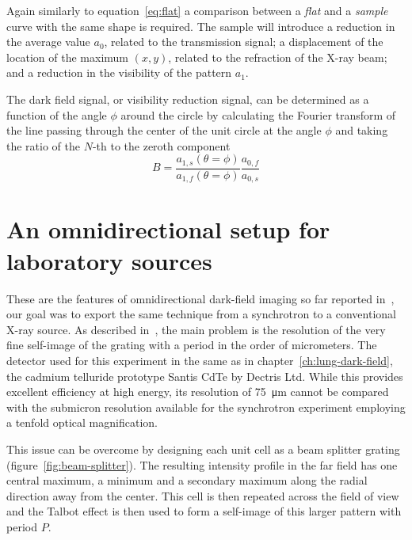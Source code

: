 Again similarly to equation~\ref{eq:flat} a comparison between a
\emph{flat} and a \emph{sample} curve with the same shape is required. The
sample will introduce a reduction in the average value $a_0$, related to the
transmission signal; a displacement of the location of the maximum $(x, y)$,
related to the refraction of the X-ray beam; and a reduction in the
visibility of the pattern $a_1$. 

The dark field signal, or visibility reduction signal, can be
determined as a function of the angle $\phi$ around the circle by
calculating the Fourier transform of the line passing through the center of
the unit circle at the angle $\phi$ and taking the ratio of the $N$-th to
the zeroth component
\begin{equation}
    B = \frac{a_{1,s}(\theta = \phi)}{a_{1,f}(\theta =
\phi)}\frac{a_{0,f}}{a_{0,s}}
    \label{eq:dark-field-omnidirectional}
\end{equation}

\section{An omnidirectional setup for laboratory sources}
These are the features of omnidirectional dark-field imaging so far reported
in~\parencite{PhysRevLett.116.093902}, our goal was to export the same
technique from a synchrotron to a conventional X-ray source.
As described in~\parencite{kagias2018omnidir}, the main problem is the
resolution of
the very fine self-image of the grating with a period in the order of 
micrometers. The detector used for this experiment in the same as in
chapter~\ref{ch:lung-dark-field}, the cadmium telluride prototype Santis
CdTe by Dectris Ltd. While this provides excellent efficiency at high
energy, its resolution of \SI{75}{\micro\meter} cannot be compared with the
submicron resolution available for the synchrotron experiment employing a tenfold optical magnification.

This issue can be overcome by designing each unit cell as a beam splitter
grating (figure~\ref{fig:beam-splitter}). The resulting intensity profile in the far
field has one central maximum, a minimum and a secondary maximum along the
radial direction away from the center. This cell
is then repeated across the field of view and the Talbot effect is then used
to form a self-image of this larger pattern with period $P$.

